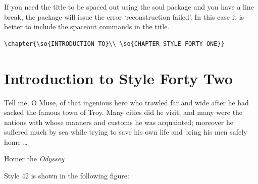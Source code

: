 If you need the title to be spaced out using the soul package and you have a line break, the package will issue the error `reconstruction failed'. In this case it is better to include the spaceout commands in the title.


\begin{verbatim}
\chapter{\so{INTRODUCTION TO}\\ \so{CHAPTER STYLE FORTY ONE}}
\end{verbatim}



\chapter{Introduction to Style Forty Two}

\epigraph{Tell me, O Muse, of that ingenious hero who trawled far and wide after he had
sacked the famous town of Troy. Many cities did he visit, and many were the nations with whose manners
and customs he was acquainted; moreover he suffered much by sea while trying to save his own life and bring
his men safely home \ldots }{Homer the \textit{Odyssey}}

Style 42 is shown in the following figure:

